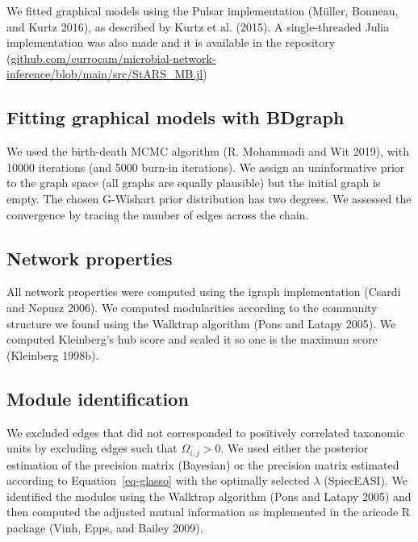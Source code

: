 \documentclass[
  a4paper,
]{article}
\begin{document}
We fitted graphical models using the Pulsar implementation (Müller,
Bonneau, and Kurtz 2016), as described by Kurtz et al. (2015). A
single-threaded Julia implementation was also made and it is available
in the repository
(\href{https://github.com/currocam/microbial-network-inference/blob/main/src/StARS_MB.jl}{github.com/currocam/microbial-network-inference/blob/main/src/StARS\_MB.jl})

\hypertarget{fitting-graphical-models-with-bdgraph}{%
\subsection{Fitting graphical models with
BDgraph}\label{fitting-graphical-models-with-bdgraph}}

We used the birth-death MCMC algorithm (R. Mohammadi and Wit 2019), with
10000 iterations (and 5000 burn-in iterations). We assign an
uninformative prior to the graph space (all graphs are equally
plausible) but the initial graph is empty. The chosen G-Wishart prior
distribution has two degrees. We assessed the convergence by tracing the
number of edges across the chain.

\hypertarget{network-properties}{%
\subsection{Network properties}\label{network-properties}}

All network properties were computed using the igraph implementation
(Csardi and Nepusz 2006). We computed modularities according to the
community structure we found using the Walktrap algorithm (Pons and
Latapy 2005). We computed Kleinberg's hub score and scaled it so one is
the maximum score (Kleinberg 1998b).

\hypertarget{module-identification-1}{%
\subsection{Module identification}\label{module-identification-1}}

We excluded edges that did not corresponded to positively correlated
taxonomic units by excluding edges such that \(\Omega_{i, j}>0\). We
used either the posterior estimation of the precision matrix (Bayesian)
or the precision matrix estimated according to Equation~\ref{eq-glasso}
with the optimally selected \(\lambda\) (SpiecEASI). We identified the
modules using the Walktrap algorithm (Pons and Latapy 2005) and then
computed the adjusted mutual information as implemented in the aricode R
package (Vinh, Epps, and Bailey 2009).
\end{document}

